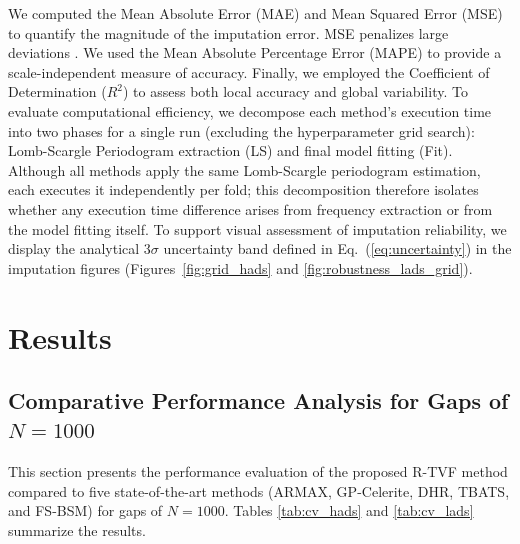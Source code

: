 \documentclass[a4paper,fleqn]{cas-sc}
\begin{document}
We computed the Mean Absolute Error (MAE) and Mean Squared Error (MSE) to quantify the magnitude of the imputation error. MSE penalizes large deviations \cite{hewamalage2023forecast}. We used the Mean Absolute Percentage Error (MAPE) to provide a scale-independent measure of accuracy. Finally, we employed the Coefficient of Determination ($R^2$) to assess both local accuracy and global variability. To evaluate computational efficiency, we decompose each method's execution time into two phases {\color{blue}for a single run (excluding the hyperparameter grid search)}: Lomb-Scargle Periodogram extraction (LS) and final model fitting (Fit). Although all methods apply the same Lomb-Scargle periodogram estimation, each executes it independently per fold; this decomposition therefore isolates whether any execution time difference arises from frequency extraction or from the model fitting itself. {\color{blue}To support visual assessment of imputation reliability, we display the analytical $3\sigma$ uncertainty band defined in Eq.~(\ref{eq:uncertainty}) in the imputation figures (Figures~\ref{fig:grid_hads} and \ref{fig:robustness_lads_grid}).}




\section{Results} \label{sec:results_discuss}


\subsection{Comparative Performance Analysis for Gaps of $N=1000$} \label{sec:comparative_results}

This section presents the performance evaluation of the proposed R-TVF method compared to five state-of-the-art methods (ARMAX, GP-Celerite, DHR, TBATS, and FS-BSM) for gaps of $N=1000$. Tables \ref{tab:cv_hads} and \ref{tab:cv_lads} summarize the results.
\end{document}
